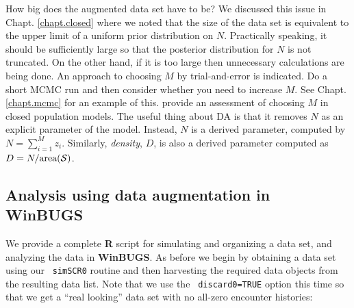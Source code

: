 How big does the augmented data set have to be? We discussed this
issue in Chapt. \ref{chapt.closed} where we noted that the size of the
data set is equivalent to the upper limit of a uniform prior
distribution on $N$.  Practically speaking, it should be sufficiently
large so that the posterior distribution for $N$ is not truncated. On
the other hand, if it is too large then unnecessary calculations are
being done. An approach to choosing $M$ by trial-and-error is
indicated.
Do a short MCMC run and then consider
whether you need to increase $M$. See Chapt. \ref{chapt.mcmc} for an
example of this. \citet[][ch. 6]{kery_schaub:2011} provide an
assessment of choosing $M$ in closed population models.
The useful thing about DA
is that it removes $N$ as an explicit parameter of
the model. Instead, $N$ is a derived parameter, computed by $N=
\sum_{i=1}^{M} z_{i}$. Similarly, {\it density}, $D$, is also a
derived parameter computed as $D=N/\mbox{area}({\cal S})$.



\subsection{Analysis using data augmentation in WinBUGS}

We provide a complete {\bf R} script for simulating and organizing a
data set, and analyzing the data in {\bf WinBUGS}.
As before we begin by obtaining a data set using our \mbox{\tt
  simSCR0} routine and then harvesting the required data objects
from the resulting data list.  Note that we use the \mbox{\tt
  discard0=TRUE} option this time so that we get a ``real looking'' data set
with no all-zero encounter histories:

